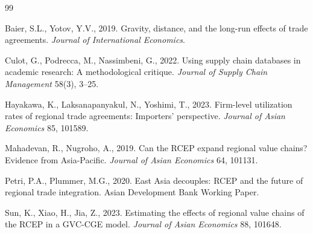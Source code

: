 \documentclass[preprint,12pt,authoryear]{elsarticle}
\begin{document}
\begin{thebibliography}{99}

Baier, S.L., Yotov, Y.V., 2019. Gravity, distance, and the long-run effects of trade agreements. \textit{Journal of International Economics}.

Culot, G., Podrecca, M., Nassimbeni, G., 2022. Using supply chain databases in academic research: A methodological critique. \textit{Journal of Supply Chain Management} 58(3), 3--25.

Hayakawa, K., Laksanapanyakul, N., Yoshimi, T., 2023. Firm-level utilization rates of regional trade agreements: Importers' perspective. \textit{Journal of Asian Economics} 85, 101589.

Mahadevan, R., Nugroho, A., 2019. Can the RCEP expand regional value chains? Evidence from Asia-Pacific. \textit{Journal of Asian Economics} 64, 101131.

Petri, P.A., Plummer, M.G., 2020. East Asia decouples: RCEP and the future of regional trade integration. Asian Development Bank Working Paper.

Sun, K., Xiao, H., Jia, Z., 2023. Estimating the effects of regional value chains of the RCEP in a GVC-CGE model. \textit{Journal of Asian Economics} 88, 101648.

\end{thebibliography}
\end{document}
